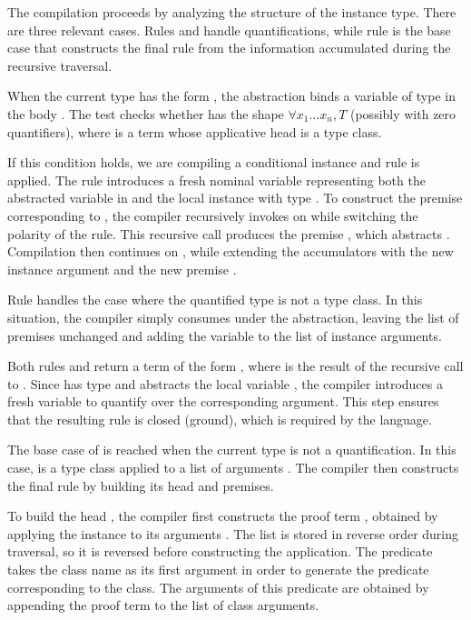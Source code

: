 The compilation proceeds by analyzing the structure of the instance type.
There are three relevant cases. Rules  and
 handle quantifications, while rule
 is the base case that constructs the final \elpi rule
from the information accumulated during the recursive traversal.

When the current type has the form , the abstraction binds
a variable of type  in the body . The test 
checks whether  has the shape
$\forall x_1 \dots x_n, T$ (possibly with zero quantifiers), where  is a
term whose applicative head is a type class.

If this condition holds, we are compiling a conditional instance and rule
 is applied. The rule introduces a fresh nominal variable
 representing both the abstracted variable in  and the local
instance with type . To construct the premise
corresponding to , the compiler recursively invokes  on 
while switching the polarity of the rule. This recursive call produces the
premise , which abstracts . Compilation then continues on
, while extending the accumulators with the new instance argument
 and the new premise .

Rule  handles the case where the quantified type is not a
type class. In this situation, the compiler simply consumes under the
abstraction, leaving the list of premises  unchanged and adding the
variable  to the list of instance arguments.

Both rules  and  return a term of the form
, where  is the result of the recursive call to
. Since  has type  and abstracts the local
variable , the compiler introduces a fresh variable  to quantify
over the corresponding argument. This step ensures that the resulting rule is
closed (ground), which is required by the \elpi language.

The base case of  is reached when the current type  is not a
quantification. In this case,  is a type class  applied to a list
of arguments . The compiler then constructs the final rule by building
its head and premises.

To build the head , the compiler first constructs the proof term
, obtained by applying the instance  to its arguments
. The list  is stored in reverse order during traversal, so
it is reversed before constructing the application. The predicate
 takes the class name as its first argument in order to
generate the predicate corresponding to the class. The arguments of this
predicate are obtained by appending the proof term to the list of class
arguments.

